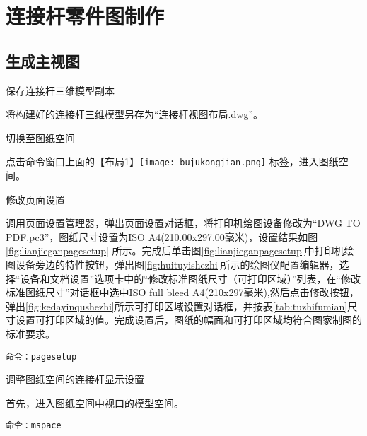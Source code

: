 \section{连接杆零件图制作}
\subsection{生成主视图}
\begin{procedure}
\item 保存连接杆三维模型副本

将构建好的连接杆三维模型另存为“连接杆视图布局.dwg”。

\item 切换至图纸空间

点击命令窗口上面的【布局1】\texttt{[image: bujukongjian.png]} 标签，进入图纸空间。

\item 修改页面设置

调用页面设置管理器，弹出页面设置对话框，将打印机绘图设备修改为“DWG TO PDF.pc3”，图纸尺寸设置为ISO A4(210.00x297.00毫米)，设置结果如图\ref{fig:lianjieganpagesetup} 所示。完成后单击图\ref{fig:lianjieganpagesetup}中打印机绘图设备旁边的特性按钮，弹出图\ref{fig:huituyishezhi}所示的绘图仪配置编辑器，选择“设备和文档设置”选项卡中的“修改标准图纸尺寸（可打印区域）”列表，在“修改标准图纸尺寸”对话框中选中ISO full bleed A4(210x297毫米),然后点击修改按钮，弹出\ref{fig:kedayinqushezhi}所示可打印区域设置对话框，并按表\ref{tab:tuzhifumian}尺寸设置可打印区域的值。完成设置后，图纸的幅面和可打印区域均符合图家制图的标准要求。

\begin{figure}[htbp]
\centering
\begin{floatrow}[3]
\end{floatrow}
\end{figure}

\begin{lstlisting}
命令：pagesetup
\end{lstlisting}

\item 调整图纸空间的连接杆显示设置

首先，进入图纸空间中视口的模型空间。
\begin{lstlisting}
命令：mspace
\end{lstlisting}


\end{procedure}
